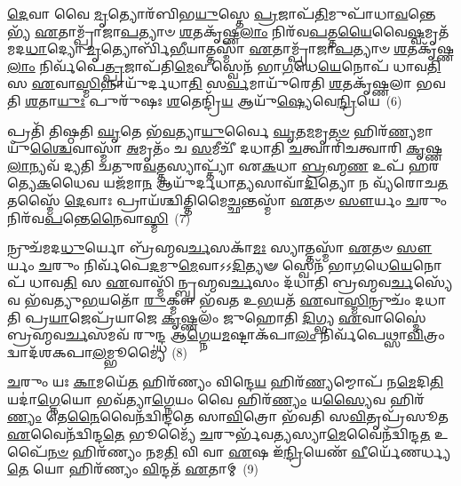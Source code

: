 {\anuvakamend[{\-\ul{𑌧𑌾}\-𑌰𑌯᳴𑌦𑍍𑌵𑌤𑍋 𑌮𑌰𑍁𑌤𑍋 𑌗𑌚𑍍𑌛\-\ul{𑌤𑌿} 𑌵𑌿\-\ul{𑌶}\-𑌮\-\ul{𑌵𑍈}\-𑌤\-\ul{𑌦}\-𑌷𑍍𑌟𑌾𑌦᳴𑌶 𑌚}]}%

\-\ul{𑌦𑍇}\-𑌵𑌾 𑌵𑍈 \ul{𑌮𑍃}\-𑌤𑍍𑌯𑍋𑌰᳴𑌬𑌿𑌭\-\ul{𑌯𑍁}\-𑌸𑍍𑌤𑍇 \ul{𑌪𑍍𑌰}\-𑌜𑌾𑌪᳴\-\ul{𑌤𑌿}\-𑌮𑍁𑌪𑌾᳴𑌧𑌾\-\ul{𑌵}\-𑌨𑍍𑌤𑍇𑌭𑍍𑌯᳴ \ul{𑌏}\-𑌤𑌾𑌮𑍍𑌪𑍍𑌰𑌾᳴𑌜𑌾\-\ul{𑌪}\-𑌤𑍍𑌯𑌾𑍞 \ul{𑌶}\-𑌤𑌕𑍃᳴𑌷𑍍𑌣\-\ul{𑌲𑌾𑌂} 𑌨𑌿𑌰᳴𑌵\-\ul{𑌪}\-𑌤𑍍𑌤\-\ul{𑌯𑍈}\-𑌵𑍈\-\ul{𑌷𑍍𑌵}\-𑌮𑍃𑌤᳴𑌮𑌦\-\ul{𑌧𑌾}\-𑌦𑍍𑌯𑍋 \ul{𑌮𑍃}\-𑌤𑍍𑌯𑍋𑌰𑍍𑌬𑌿᳴\-\ul{𑌭𑍀}\-𑌯𑌾𑌤𑍍𑌤𑌸𑍍𑌮𑌾᳴ \ul{𑌏}\-𑌤𑌾𑌮𑍍𑌪𑍍𑌰𑌾᳴𑌜𑌾\-\ul{𑌪}\-𑌤𑍍𑌯𑌾𑍞 \ul{𑌶}\-𑌤𑌕𑍃᳴𑌷𑍍𑌣\-\ul{𑌲𑌾𑌂} 𑌨𑌿𑌰𑍍𑌵᳴𑌪𑍇\-\ul{𑌤𑍍𑌪𑍍𑌰}\-𑌜𑌾𑌪᳴𑌤𑌿\-\ul{𑌮𑍇}\-𑌵 𑌸𑍍𑌵𑍇𑌨᳴ 𑌭𑌾\-\ul{𑌗}\-𑌧𑍇\-\ul{𑌯𑍇}\-𑌨𑍋𑌪᳴ 𑌧𑌾𑌵\-\ul{𑌤𑌿} 𑌸 \ul{𑌏}\-𑌵𑌾\-\ul{𑌸𑍍𑌮𑌿}\-𑌨𑍍𑌨𑌾𑌯𑍁᳴𑌰𑍍𑌦𑌧𑌾\-\ul{𑌤𑌿} 𑌸\-\ul{𑌰𑍍𑌵}\-𑌮𑌾𑌯𑍁᳴𑌰𑍇𑌤𑌿 \ul{𑌶}\-𑌤𑌕𑍃᳴𑌷𑍍𑌣𑌲𑌾 𑌭𑌵𑌤𑌿 \ul{𑌶}\-𑌤𑌾\-\ul{𑌯𑍁𑌃} 𑌪𑍁𑌰𑍁᳴𑌷𑌃 \ul{𑌶}\-𑌤𑍇𑌨𑍍𑌦𑍍𑌰𑌿᳴\-\ul{𑌯} 𑌆𑌯𑍁᳴\-\ul{𑌷𑍍𑌯𑍇}\-𑌵𑍇\-\ul{𑌨𑍍𑌦𑍍𑌰𑌿}\-𑌯𑍇~(6)

𑌪𑍍𑌰𑌤𑌿᳴ 𑌤𑌿𑌷𑍍𑌠𑌤𑌿 \ul{𑌘𑍃}\-𑌤𑍇 𑌭᳴\-\ul{𑌵}\-𑌤𑍍𑌯𑌾\-\ul{𑌯𑍁}\-𑌰𑍍𑌵𑍈 \ul{𑌘𑍃}\-𑌤\-\ul{𑌮}\-𑌮𑍃\-\ul{𑌤}\-\-\ul{𑍞} 𑌹𑌿𑌰᳴\-\ul{𑌣𑍍𑌯}\-𑌮𑌾𑌯𑍁᳴\-\ul{𑌶𑍍𑌚𑍈}\-𑌵𑌾\-𑌸𑍍𑌮𑌾᳴ \ul{𑌅}\-𑌮𑍃𑌤𑌂᳴ 𑌚 \ul{𑌸}\-𑌮𑍀𑌚𑍀᳴ 𑌦𑌧𑌾𑌤𑌿 \ul{𑌚}\-𑌤𑍍𑌵𑌾𑌰𑌿᳴𑌚𑌤𑍍𑌵𑌾𑌰𑌿 \ul{𑌕𑍃}\-𑌷𑍍𑌣\-\ul{𑌲𑌾}\-𑌨𑍍𑌯𑌵᳴ 𑌦𑍍𑌯𑌤𑌿 𑌚𑌤𑍁𑌰\-\ul{𑌵}\-𑌤𑍍𑌤𑌸𑍍𑌯𑌾𑌪𑍍𑌤𑍍𑌯𑌾᳴ 𑌏\-\ul{𑌕}\-𑌧𑌾 \ul{𑌬𑍍𑌰}\-𑌹𑍍𑌮\-\ul{𑌣} 𑌉𑌪᳴ 𑌹𑌰𑌤𑍍𑌯𑍇\-\ul{𑌕}\-𑌧𑍈𑌵 𑌯𑌜᳴𑌮𑌾\-\ul{𑌨} 𑌆𑌯𑍁᳴𑌰𑍍𑌦𑌧𑌾\-\ul{𑌤𑍍𑌯}\-𑌸𑌾𑌵𑌾᳴\-\ul{𑌦𑌿}\-𑌤𑍍𑌯𑍋 𑌨 𑌵𑍍𑌯᳴𑌰𑍋𑌚\-\ul{𑌤} 𑌤𑌸𑍍𑌮𑍈᳴ \ul{𑌦𑍇}\-𑌵𑌾𑌃 𑌪𑍍𑌰𑌾𑌯᳴𑌶𑍍𑌚𑌿𑌤𑍍𑌤𑌿\-𑌮𑍈\-\ul{𑌚𑍍𑌛}\-𑌨𑍍𑌤𑌸𑍍𑌮𑌾᳴ \ul{𑌏}\-𑌤𑍞 \ul{𑌸𑍗}\-𑌰𑍍𑌯𑌂 \ul{𑌚}\-𑌰𑍁𑌂 𑌨𑌿𑌰᳴𑌵\-\ul{𑌪}\-𑌨𑍍𑌤𑍇\-\ul{𑌨𑍈}\-𑌵𑌾\-\ul{𑌸𑍍𑌮𑌿}\-~(7)

𑌨𑍍𑌰𑍁𑌚᳴𑌮𑌦\-\ul{𑌧𑍁}\-𑌰𑍍𑌯𑍋 𑌬𑍍𑌰᳴𑌹𑍍𑌮𑌵\-\ul{𑌰𑍍𑌚}\-𑌸𑌕𑌾᳴\-\ul{𑌮𑌃} 𑌸𑍍𑌯𑌾𑌤𑍍𑌤𑌸𑍍𑌮𑌾᳴ \ul{𑌏}\-𑌤𑍞 \ul{𑌸𑍗}\-𑌰𑍍𑌯𑌂 \ul{𑌚}\-𑌰𑍁𑌂 𑌨𑌿𑌰𑍍𑌵᳴𑌪𑍇\-\ul{𑌦}\-𑌮𑍁\-\ul{𑌮𑍇}\-𑌵𑌾𑌽𑌽\-\ul{𑌦𑌿}\-𑌤𑍍𑌯𑍟 𑌸𑍍𑌵𑍇𑌨᳴ 𑌭𑌾\-\ul{𑌗}\-𑌧𑍇\-\ul{𑌯𑍇}\-𑌨𑍋𑌪᳴ 𑌧𑌾𑌵\-\ul{𑌤𑌿} 𑌸 \ul{𑌏}\-𑌵𑌾𑌸𑍍𑌮𑌿᳴𑌨𑍍𑌬𑍍𑌰𑌹𑍍𑌮𑌵\-\ul{𑌰𑍍𑌚}\-𑌸𑌂 𑌦᳴𑌧𑌾𑌤𑌿 𑌬𑍍𑌰𑌹𑍍𑌮𑌵\-\ul{𑌰𑍍𑌚}\-𑌸𑍍𑌯𑍇᳴𑌵 𑌭᳴𑌵𑌤𑍍𑌯𑍁\-\ul{𑌭}\-𑌯𑌤𑍋᳴ \ul{𑌰𑍁}\-𑌕𑍍𑌮𑍗 𑌭᳴𑌵𑌤 𑌉\-\ul{𑌭}\-𑌯𑌤᳴ \ul{𑌏}\-𑌵𑌾\-\ul{𑌸𑍍𑌮𑌿}\-𑌨𑍍𑌰𑍁𑌚𑌂᳴ 𑌦𑌧𑌾𑌤𑌿 𑌪𑍍𑌰\-\ul{𑌯𑌾}\-𑌜𑍇𑌪𑍍𑌰᳴𑌯𑌾𑌜𑍇 \ul{𑌕𑍃}\-𑌷𑍍𑌣𑌲𑌂᳴ 𑌜𑍁𑌹𑍋𑌤𑌿 \ul{𑌦𑌿}\-𑌗𑍍𑌭𑍍𑌯 \ul{𑌏}\-𑌵𑌾𑌸𑍍𑌮𑍈॑ 𑌬𑍍𑌰𑌹𑍍𑌮𑌵\-\ul{𑌰𑍍𑌚}\-𑌸𑌮𑌵᳴ 𑌰𑍁𑌨𑍍𑌦𑍍𑌧 𑌆\-\ul{𑌗𑍍𑌨𑍇}\-𑌯\-\ul{𑌮}\-𑌷𑍍𑌟𑌾\-𑌕᳴𑌪𑌾\-\ul{𑌲𑌂} 𑌨𑌿𑌰𑍍𑌵᳴𑌪𑍇𑌥𑍍𑌸𑌾\-\ul{𑌵𑌿}\-𑌤𑍍𑌰𑌂 𑌦𑍍𑌵𑌾𑌦᳴𑌶\-𑌕𑌪𑌾\-\ul{𑌲}\-𑌮𑍍𑌭𑍂𑌮𑍍𑌯𑍈॑~(8)

\-\ul{𑌚}\-𑌰𑍁𑌂 𑌯𑌃 \ul{𑌕𑌾}\-𑌮𑌯𑍇᳴\-\ul{𑌤} 𑌹𑌿𑌰᳴𑌣𑍍𑌯𑌂 𑌵𑌿𑌨𑍍𑌦𑍇\-\ul{𑌯} 𑌹𑌿𑌰᳴\-\ul{𑌣𑍍𑌯}\-𑌮𑍍𑌮𑍋𑌪᳴ 𑌨\-\ul{𑌮𑍇}\-𑌦𑌿\-\ul{𑌤𑌿} 𑌯𑌦𑌾॑\-\ul{𑌗𑍍𑌨𑍇}\-𑌯𑍋 𑌭𑌵᳴𑌤𑍍𑌯𑌾\-\ul{𑌗𑍍𑌨𑍇}\-𑌯𑌂 𑌵𑍈 𑌹𑌿𑌰᳴\-\ul{𑌣𑍍𑌯𑌂} 𑌯\-\ul{𑌸𑍍𑌯𑍈}\-𑌵 𑌹𑌿𑌰᳴\-\ul{𑌣𑍍𑌯𑌂} 𑌤𑍇\-\ul{𑌨𑍈}\-𑌵𑍈𑌨᳴𑌦𑍍𑌵𑌿𑌨𑍍𑌦𑌤𑍇 𑌸𑌾\-\ul{𑌵𑌿}\-𑌤𑍍𑌰𑍋 𑌭᳴𑌵𑌤𑌿 𑌸\-\ul{𑌵𑌿}\-𑌤𑍃𑌪𑍍𑌰᳴𑌸𑍂𑌤 \ul{𑌏}\-𑌵𑍈𑌨᳴𑌦𑍍𑌵𑌿𑌨𑍍𑌦\-\ul{𑌤𑍇} 𑌭𑍂𑌮𑍍𑌯𑍈᳴ \ul{𑌚}\-𑌰𑍁𑌰𑍍𑌭᳴𑌵\-\ul{𑌤𑍍𑌯}\-𑌸𑍍𑌯𑌾\-\ul{𑌮𑍇}\-𑌵𑍈𑌨᳴𑌦𑍍𑌵𑌿𑌨𑍍𑌦\-\ul{𑌤} 𑌉𑌪𑍈᳴\-\ul{𑌨}\-\-\ul{𑍞} 𑌹𑌿𑌰᳴𑌣𑍍𑌯𑌂 𑌨𑌮\-\ul{𑌤𑌿} 𑌵𑌿 𑌵𑌾 \ul{𑌏}\-𑌷 𑌇᳴\-\ul{𑌨𑍍𑌦𑍍𑌰𑌿}\-𑌯𑍇𑌣᳴ \ul{𑌵𑍀}\-𑌰𑍍𑌯𑍇᳴𑌣𑌰𑍍𑌧𑍍𑌯\-\ul{𑌤𑍇} 𑌯𑍋 𑌹𑌿𑌰᳴𑌣𑍍𑌯𑌂 \ul{𑌵𑌿}\-𑌨𑍍𑌦𑌤᳴ \ul{𑌏}\-𑌤𑌾𑌮𑍍~(9)

